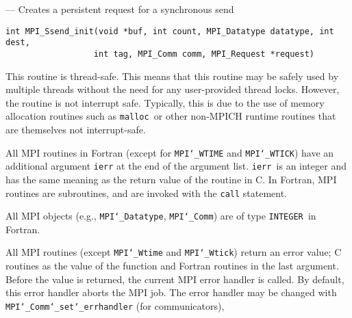 \startmanpage
{}
--- Creates a persistent request for a synchronous send 
\startvb\begin{verbatim}
int MPI_Ssend_init(void *buf, int count, MPI_Datatype datatype, int dest,
                  int tag, MPI_Comm comm, MPI_Request *request)

\end{verbatim}
\endvb

\par
{}
\par
{}
\par
This routine is thread-safe.  This means that this routine may be
safely used by multiple threads without the need for any user-provided
thread locks.  However, the routine is not interrupt safe.  Typically,
this is due to the use of memory allocation routines such as {\tt malloc
}or other non-MPICH runtime routines that are themselves not interrupt-safe.
\par
{}
All MPI routines in Fortran (except for {\tt MPI{\tt \char`\_}WTIME} and {\tt MPI{\tt \char`\_}WTICK}) have
an additional argument {\tt ierr} at the end of the argument list.  {\tt ierr
}is an integer and has the same meaning as the return value of the routine
in C.  In Fortran, MPI routines are subroutines, and are invoked with the
{\tt call} statement.
\par
All MPI objects (e.g., {\tt MPI{\tt \char`\_}Datatype}, {\tt MPI{\tt \char`\_}Comm}) are of type {\tt INTEGER
}in Fortran.
\par
{}
\par
All MPI routines (except {\tt MPI{\tt \char`\_}Wtime} and {\tt MPI{\tt \char`\_}Wtick}) return an error value;
C routines as the value of the function and Fortran routines in the last
argument.  Before the value is returned, the current MPI error handler is
called.  By default, this error handler aborts the MPI job.  The error handler
may be changed with {\tt MPI{\tt \char`\_}Comm{\tt \char`\_}set{\tt \char`\_}errhandler} (for communicators),
